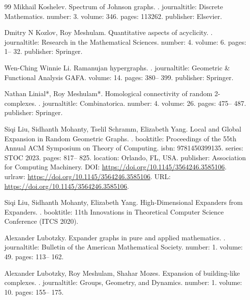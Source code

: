 \begin{thebibliography}{99}
Mikhail Koshelev.
\newblock Spectrum of Johnson graphs.
.
\newblock journaltitle: Discrete Mathematics.
\newblock number: 3.
\newblock volume: 346.
\newblock pages: 113262.
\newblock publisher: Elsevier.

Dmitry N Kozlov, Roy Meshulam.
\newblock Quantitative aspects of acyclicity.
.
\newblock journaltitle: Research in the Mathematical Sciences.
\newblock number: 4.
\newblock volume: 6.
\newblock pages: 1-- 32.
\newblock publisher: Springer.

Wen-Ching Winnie Li.
\newblock Ramanujan hypergraphs.
.
\newblock journaltitle: Geometric \& Functional Analysis GAFA.
\newblock volume: 14.
\newblock pages: 380-- 399.
\newblock publisher: Springer.

Nathan Linial*, Roy Meshulam*.
\newblock Homological connectivity of random 2-complexes.
.
\newblock journaltitle: Combinatorica.
\newblock number: 4.
\newblock volume: 26.
\newblock pages: 475-- 487.
\newblock publisher: Springer.

Siqi Liu, Sidhanth Mohanty, Tselil Schramm, Elizabeth Yang.
\newblock Local and Global Expansion in Random Geometric Graphs.
.
\newblock booktitle: Proceedings of the 55th Annual ACM Symposium on Theory of Computing.
\newblock isbn: 9781450399135.
\newblock series: STOC 2023.
\newblock pages: 817-- 825.
\newblock location: Orlando, FL, USA.
\newblock publisher: Association for Computing Machinery.
\newblock DOI: \url{https://doi.org/10.1145/3564246.3585106}.
\newblock urlraw: \url{https://doi.org/10.1145/3564246.3585106}.
\newblock URL: \url{https://doi.org/10.1145/3564246.3585106}.

Siqi Liu, Sidhanth Mohanty, Elizabeth Yang.
\newblock High-Dimensional Expanders from Expanders.
.
\newblock booktitle: 11th Innovations in Theoretical Computer Science Conference (ITCS 2020).

Alexander Lubotzky.
\newblock Expander graphs in pure and applied mathematics.
.
\newblock journaltitle: Bulletin of the American Mathematical Society.
\newblock number: 1.
\newblock volume: 49.
\newblock pages: 113-- 162.

Alexander Lubotzky, Roy Meshulam, Shahar Mozes.
\newblock Expansion of building-like complexes.
.
\newblock journaltitle: Groups, Geometry, and Dynamics.
\newblock number: 1.
\newblock volume: 10.
\newblock pages: 155-- 175.


\end{thebibliography}
